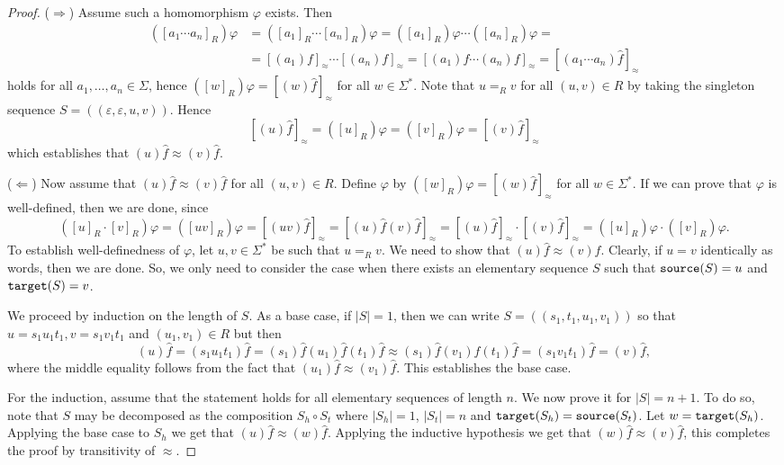 \begin{proof}
  \rocqok{}
  ($\Rightarrow$) Assume such a homomorphism $\varphi$ exists. Then
  \begin{align*}
    ({[a_1\cdots a_n]}_{R})\varphi &= ({[a_1]}_{R}\cdots {[a_n]}_{R})\varphi =
    ({[a_1]}_{R})\varphi \cdots ({[a_n]}_{R})\varphi = \\
    &= {[(a_1)f]}_{\approx}\cdots {[(a_n)f]}_{\approx} =
    {\left[(a_1)f\cdots(a_n)f\right]}_{\approx} =
    {\left[(a_1\cdots a_n)\widehat{f}\right]}_{\approx}
  \end{align*}
  holds for all $a_1,\ldots, a_n \in \Sigma$, hence
  $({[w]}_{R})\varphi = {\left[(w)\widehat{f}\right]}_{\approx}$ for all $w\in \Sigma^\ast$.
  Note that $u =_{R} v$ for all $(u, v)\in R$ by taking the singleton
  sequence $S = ((\varepsilon, \varepsilon, u, v))$. Hence
  \[
    {\left[(u)\widehat{f}\right]}_{\approx} = ({[u]}_{R})\varphi =
    ({[v]}_{R})\varphi = {\left[(v)\widehat{f}\right]}_{\approx}
  \]
  which establishes that $(u)\widehat{f} \approx (v)\widehat{f}$.

  ($\Leftarrow$) Now assume that $(u)\widehat{f} \approx (v)\widehat{f}$ for all
  $(u, v)\in R$. Define $\varphi$ by
  $({[w]}_{R})\varphi = {\left[(w)\widehat{f}\right]}_{\approx}$ for all $w\in \Sigma^\ast$. If we can prove that
  $\varphi$ is well-defined, then we are done, since
  \[
    ({[u]}_{R}\cdot {[v]}_{R})\varphi =
    ({[uv]}_{R})\varphi =
    {\left[(uv)\widehat{f}\right]}_{\approx} =
    {\left[(u)\widehat{f}(v)\widehat{f}\right]}_{\approx} =
    {\left[(u)\widehat{f}\right]}_{\approx}\cdot {\left[(v)\widehat{f}\right]}_{\approx} =
    ({[u]}_{R})\varphi \cdot ({[v]}_{R})\varphi.
  \]
  To establish well-definedness of $\varphi$, let $u, v\in \Sigma^\ast$ be such that $u =_{R} v$. We need to show that
  $(u)\widehat{f} \approx (v)\widehat{f}$. Clearly, if $u = v$ identically as words, then we are done. So, we only need
  to consider the case when there exists an elementary sequence $S$ such that $\texttt{source}(S) = u$ and $\texttt{target}(S) = v$.

  We proceed by induction on the length of $S$. As a base case, if $|S| = 1$, then we can write
  $S = ((s_1, t_1, u_1, v_1))$ so that $u = s_1 u_1 t_1, v=s_1 v_1t_1$ and
  $(u_1, v_1)\in R$ but then
  \[
    (u)\widehat{f} = (s_1u_1t_1)\widehat{f} =
    (s_1)\widehat{f}
    (u_1)\widehat{f}
    (t_1)\widehat{f} \approx
    (s_1)\widehat{f}
    (v_1)\widehat{f}
    (t_1)\widehat{f} =
    (s_1v_1t_1)\widehat{f}=
    (v)\widehat{f},
  \]
  where the middle equality follows from the fact that
  $(u_1)\widehat{f} \approx (v_1)\widehat{f}$. This establishes the base case.

  For the induction, assume that the statement holds for all elementary sequences of length $n$. We
  now prove it for $|S| = n+1$. To do so, note that $S$ may be decomposed as the composition $S_h
  \circ S_t$ where $|S_h| = 1$, $|S_t| = n$ and
  $\texttt{target}(S_h) = \texttt{source}(S_t)$. Let $w = \texttt{target}(S_h)$.
  Applying the base case to $S_h$ we get that $(u)\widehat{f} \approx (w)\widehat{f}$. Applying the
  inductive hypothesis we get that $(w)\widehat{f} \approx (v)\widehat{f}$,
  this completes the proof by transitivity of $\approx$.
\end{proof}

